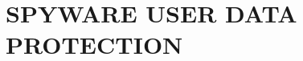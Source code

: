 \documentclass[sigconf,balance=false]{acmart}
\newcommand{\alex}[1]{\textcolor{chicagomaroon}{\noindent[AL: #1]}}
\newcommand{\sumanth}[1]{\textcolor{violet}{\noindent[SR: #1]}}
\newcommand{\damon}[1]{\textcolor{blue}{\noindent[DM: #1]}}
\newcommand{\geoff}[1]{\textcolor{purple}{\noindent[GV: #1]}}
\newcommand{\alex}[1]{}
\newcommand{\sumanth}[1]{}
\newcommand{\geoff}[1]{}
\newcommand{\damon}[1]{}
\begin{document}









\section{SPYWARE USER DATA PROTECTION}
\label{sec:data-leak}


\end{document}
